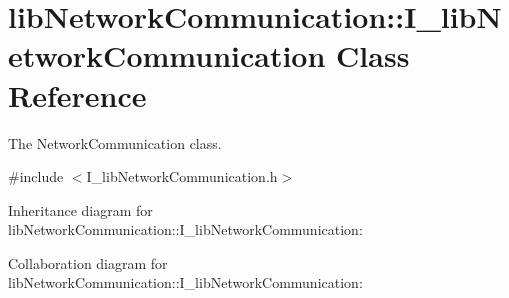 \hypertarget{classlibNetworkCommunication_1_1I__libNetworkCommunication}{}\section{lib\+Network\+Communication\+::I\+\_\+lib\+Network\+Communication Class Reference}
\label{classlibNetworkCommunication_1_1I__libNetworkCommunication}


The Network\+Communication class.  




{\ttfamily \#include $<$I\+\_\+lib\+Network\+Communication.\+h$>$}



Inheritance diagram for lib\+Network\+Communication\+::I\+\_\+lib\+Network\+Communication\+:


Collaboration diagram for lib\+Network\+Communication\+::I\+\_\+lib\+Network\+Communication\+:

